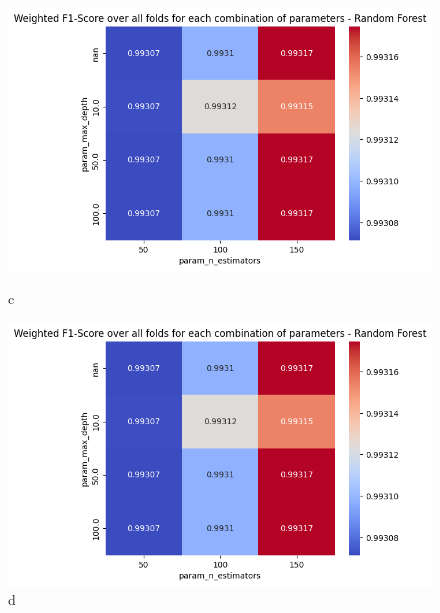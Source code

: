 \begin{figure}[H]
            \begin{minipage}{\textwidth}
                \begin{minipage}[t]{0.48\textwidth}
                    \centering
                    \includegraphics[width=\textwidth]{../figures/plots/section2/weighted_f1_score_for_each_combination_of_parameters_random_forest.png}
                    \caption{c}
                    \label{fig:c}
                \end{minipage}%
                \hfill%
                \begin{minipage}[t]{0.48\textwidth}
                    \centering
                    \includegraphics[width=\textwidth]{../figures/plots/section2/weighted_f1_score_for_each_combination_of_parameters_random_forest.png}
                    \caption{d}
                    \label{fig:d}
                \end{minipage}
            \end{minipage}
            

\end{figure}
